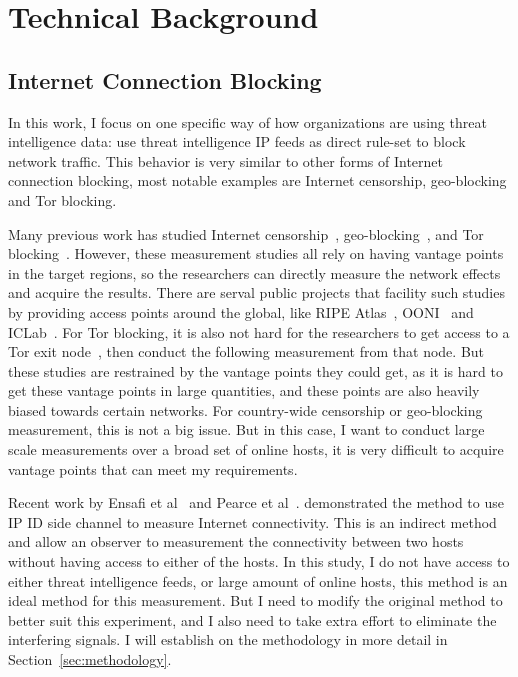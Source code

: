 \section{Technical Background}

\subsection{Internet Connection Blocking}
In this work, I focus on one specific way of how organizations are using 
threat intelligence data: use threat intelligence IP feeds as direct rule-set 
to block network traffic. This behavior is very similar to other forms of
Internet connection blocking, most notable examples are Internet censorship,
geo-blocking and Tor blocking.

Many previous work has studied Internet censorship~\cite{aryan2013internet,
park2010empirical,anderson2012splinternet,zittrain2003internet,
clayton2006ignoring}, geo-blocking~\cite{opennetsurvey, mcdonald2018403,afroz2018exploring}, 
and Tor blocking~\cite{singh2017characterizing, khattak2016you}. However, 
these measurement studies all rely on having vantage points in the target 
regions, so the researchers can directly measure the network effects and 
acquire the results. There are serval public projects that facility such 
studies by providing access points around the global, like RIPE
Atlas~\cite{ripeatlas}, OONI~\cite{ooni} and ICLab~\cite{iclab}.
For Tor blocking, it is also not hard for the researchers to get access 
to a Tor exit node~\cite{khattak2016you}, then conduct the following 
measurement from that node. But these studies are restrained by the vantage
points they could get, as it is hard to get these vantage points in large
quantities, and these points are also heavily biased towards certain networks.
For country-wide censorship or geo-blocking measurement, this is not a big
issue. But in this case, I want to conduct large scale measurements over a 
broad set of online hosts, it is very difficult to acquire vantage points 
that can meet my requirements.

Recent work by Ensafi et al~\cite{ensafi2014detecting} and Pearce et 
al~\cite{pearce2017augur}. demonstrated the method to use IP ID side 
channel to measure Internet connectivity. This is an indirect method 
and allow an observer to measurement the connectivity between two hosts 
without having access to either of the hosts. In this study, I do not 
have access to either threat intelligence feeds, or large amount of 
online hosts, this method is an ideal method for this measurement. But 
I need to modify the original method to better suit this experiment, 
and I also need to take extra effort to eliminate the interfering 
signals. I will establish on the methodology in more detail in
Section~\ref{sec:methodology}.


